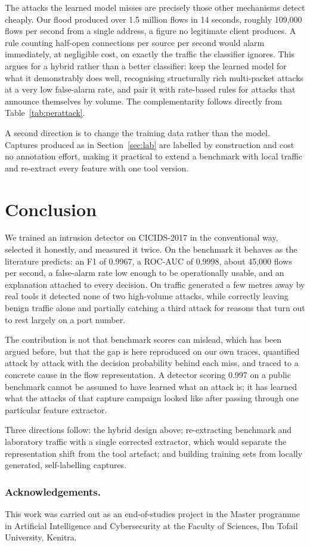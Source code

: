 \documentclass[runningheads]{llncs}
\begin{document}
The attacks the learned model misses are precisely those other mechanisms detect cheaply. Our flood produced over 1.5 million flows in 14 seconds, roughly 109,000 flows per second from a single address, a figure no legitimate client produces. A rule counting half-open connections per source per second would alarm immediately, at negligible cost, on exactly the traffic the classifier ignores. This argues for a hybrid rather than a better classifier: keep the learned model for what it demonstrably does well, recognising structurally rich multi-packet attacks at a very low false-alarm rate, and pair it with rate-based rules for attacks that announce themselves by volume. The complementarity follows directly from Table~\ref{tab:perattack}.

A second direction is to change the training data rather than the model. Captures produced as in Section~\ref{sec:lab} are labelled by construction and cost no annotation effort, making it practical to extend a benchmark with local traffic and re-extract every feature with one tool version.

\section{Conclusion}

We trained an intrusion detector on CICIDS-2017 in the conventional way, selected it honestly, and measured it twice. On the benchmark it behaves as the literature predicts: an F1 of 0.9967, a ROC-AUC of 0.9998, about 45,000 flows per second, a false-alarm rate low enough to be operationally usable, and an explanation attached to every decision. On traffic generated a few metres away by real tools it detected none of two high-volume attacks, while correctly leaving benign traffic alone and partially catching a third attack for reasons that turn out to rest largely on a port number.

The contribution is not that benchmark scores can mislead, which has been argued before, but that the gap is here reproduced on our own traces, quantified attack by attack with the decision probability behind each miss, and traced to a concrete cause in the flow representation. A detector scoring 0.997 on a public benchmark cannot be assumed to have learned what an attack is; it has learned what the attacks of that capture campaign looked like after passing through one particular feature extractor.

Three directions follow: the hybrid design above; re-extracting benchmark and laboratory traffic with a single corrected extractor, which would separate the representation shift from the tool artefact; and building training sets from locally generated, self-labelling captures.

\subsubsection{Acknowledgements.}
This work was carried out as an end-of-studies project in the Master programme in Artificial Intelligence and Cybersecurity at the Faculty of Sciences, Ibn Tofail University, Kenitra.



\end{document}
